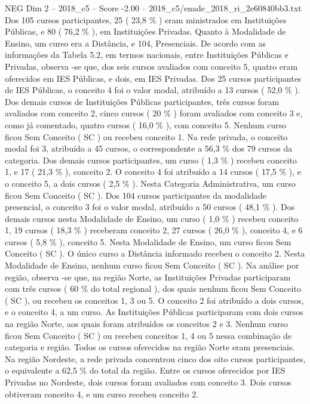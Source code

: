\begin{textsample}{NEG Dim 2 – 2018\_c5 – Score -2.00 – 2018\_c5/enade\_2018\_ri\_2e60840bb3.txt}
Dos 105 cursos participantes, 25 ( 23,8 \% ) eram ministrados em Instituições Públicas, e 80 ( 76,2 \% ), em Instituições Privadas.
Quanto à Modalidade de Ensino, um curso era a Distância, e 104, Presenciais.
De acordo com as informações da Tabela 5.2, em termos nacionais, entre Instituições Públicas e Privadas, observa -se que, dos seis cursos avaliados com conceito 5, quatro eram oferecidos em IES Públicas, e dois, em IES Privadas.
Dos 25 cursos participantes de IES Públicas, o conceito 4 foi o valor modal, atribuído a 13 cursos ( 52,0 \% ).
Dos demais cursos de Instituições Públicas participantes, três cursos foram avaliados com conceito 2, cinco cursos ( 20 \% ) foram avaliados com conceito 3 e, como já comentado, quatro cursos ( 16,0 \% ), com conceito 5.
Nenhum curso ficou Sem Conceito ( SC ) ou recebeu conceito 1.
Na rede privada, o conceito modal foi 3, atribuído a 45 cursos, o correspondente a 56,3 \% dos 79 cursos da categoria.
Dos demais cursos participantes, um curso ( 1,3 \% ) recebeu conceito 1, e 17 ( 21,3 \% ), conceito 2.
O conceito 4 foi atribuído a 14 cursos ( 17,5 \% ), e o conceito 5, a dois cursos ( 2,5 \% ).
Nesta Categoria Administrativa, um curso ficou Sem Conceito ( SC ).
Dos 104 cursos participantes da modalidade presencial, o conceito 3 foi o valor modal, atribuído a 50 cursos ( 48,1 \% ).
Dos demais cursos nesta Modalidade de Ensino, um curso ( 1,0 \% ) recebeu conceito 1, 19 cursos ( 18,3 \% ) receberam conceito 2, 27 cursos ( 26,0 \% ), conceito 4, e 6 cursos ( 5,8 \% ), conceito 5.
Nesta Modalidade de Ensino, um curso ficou Sem Conceito ( SC ).
O único curso a Distância informado recebeu o conceito 2.
Nesta Modalidade de Ensino, nenhum curso ficou Sem Conceito ( SC ).
Na análise por região, observa -se que, na região Norte, as Instituições Privadas participaram com três cursos ( 60 \% do total regional ), dos quais nenhum ficou Sem Conceito ( SC ), ou recebeu os conceitos 1, 3 ou 5.
O conceito 2 foi atribuído a dois cursos, e o conceito 4, a um curso.
As Instituições Públicas participaram com dois cursos na região Norte, aos quais foram atribuídos os conceitos 2 e 3.
Nenhum curso ficou Sem Conceito ( SC ) ou recebeu conceitos 1, 4 ou 5 nessa combinação de categoria e região.
Todos os cursos oferecidos na região Norte eram presenciais.
Na região Nordeste, a rede privada concentrou cinco dos oito cursos participantes, o equivalente a 62,5 \% do total da região.
Entre os cursos oferecidos por IES Privadas no Nordeste, dois cursos foram avaliados com conceito 3.
Dois cursos obtiveram conceito 4, e um curso recebeu conceito 2.

\end{textsample}
